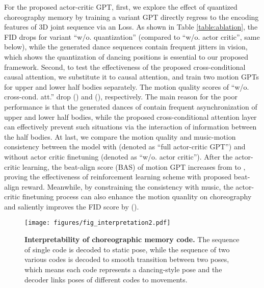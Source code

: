 For the proposed actor-critic GPT, first, we explore the effect of quantized choreography memory
by training a variant GPT 
directly 
regress to the encoding features of 3D joint sequence via an  Loss.
As shown in Table \ref{table:ablation}, the FID drops  for variant ``w/o. quantization'' (compared to ``w/o. actor critic'', same below), while the generated dance sequences contain frequent jitters in vision, which shows the quantization of dancing positions is essential to our proposed framework.
Second, to test the effectiveness of the proposed cross-conditional causal attention, we substitute it to causal attention, and train two motion GPTs for upper and lower half bodies separately. 
The motion quality scores of ``w/o. cross-cond. att.'' drop  () and  (), respectively. 
The main reason for the poor performance is that the generated dances of  contain frequent asynchronization of upper and lower half bodies, while the proposed cross-conditional attention layer can effectively prevent such situations via the interaction of information between the half bodies. 
At last, we compare the motion quality and music-motion consistency between the model with (denoted as ``full actor-critic GPT'') and without actor critic finetuning (denoted as ``w/o. actor critic'').
After the actor-critic learning, the beat-align score (BAS) of motion GPT increases from  to , proving the effectiveness of reinforcement learning scheme with proposed beat-align reward.
Meanwhile, by constraining the consistency with music, the actor-critic finetuning process can also enhance the motion quanlity on choreography and saliently improves the FID score by  ().




\begin{figure}[t]
    \small{
    \scriptsize
    \setlength{\tabcolsep}{1.5pt}
    \centering
    \vspace{-5pt}
    \texttt{[image: figures/fig\_interpretation2.pdf]}\\
    \vspace{-3pt}
\small\caption{\small{\textbf{Interpretability of choreographic memory code.} The sequence of single code is decoded to static pose, while the sequence of two various codes is decoded to smooth transition between two poses, which means each code represents a dancing-style pose and the decoder links poses of different codes to movements.}}
    \label{fig:ablation}}
    \vspace{-14pt}
\end{figure}

